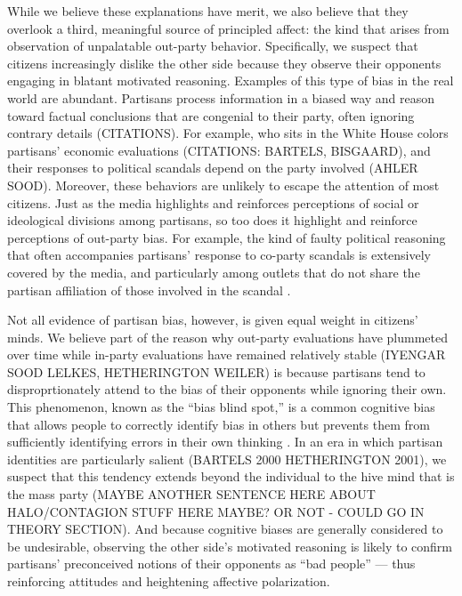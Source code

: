\documentclass[12pt, letterpaper]{article}
\begin{document}
While we believe these explanations have merit, we also believe that they overlook a third, meaningful source of principled affect: the kind that arises from observation of unpalatable out-party behavior. Specifically, we suspect that citizens increasingly dislike the other side because they observe their opponents engaging in blatant motivated reasoning. Examples of this type of bias in the real world are abundant. Partisans process information in a biased way and reason toward factual conclusions that are congenial to their party, often ignoring contrary details (CITATIONS). For example, who sits in the White House colors partisans' economic evaluations (CITATIONS: BARTELS, BISGAARD), and their responses to political scandals depend on the party involved (AHLER SOOD). Moreover, these behaviors are unlikely to escape the attention of most citizens. Just as the media highlights and reinforces perceptions of social or ideological divisions among partisans, so too does it highlight and reinforce perceptions of out-party bias. For example, the kind of faulty political reasoning that often accompanies partisans' response to co-party scandals is extensively covered by the media, and particularly among outlets that do not share the partisan affiliation of those involved in the scandal \citep{budaketal_2016,puglisisnyder_2011}. 

Not all evidence of partisan bias, however, is given equal weight in citizens' minds. We believe part of the reason why out-party evaluations have plummeted over time while in-party evaluations have remained relatively stable (IYENGAR SOOD LELKES, HETHERINGTON WEILER) is because partisans tend to disproprtionately attend to the bias of their opponents while ignoring their own. This phenomenon, known as the ``bias blind spot,'' is a common cognitive bias that allows people to correctly identify bias in others but prevents them from sufficiently identifying errors in their own thinking \citep{proninetal_2002,pronin_2007}. In an era in which partisan identities are particularly salient (BARTELS 2000 HETHERINGTON 2001), we suspect that this tendency extends beyond the individual to the hive mind that is the mass party (MAYBE ANOTHER SENTENCE HERE ABOUT HALO/CONTAGION STUFF HERE MAYBE? OR NOT - COULD GO IN THEORY SECTION). And because cognitive biases are generally considered to be undesirable, observing the other side's motivated reasoning is likely to confirm partisans' preconceived notions of their opponents as ``bad people'' --- thus reinforcing attitudes and heightening affective polarization. 
\end{document}
